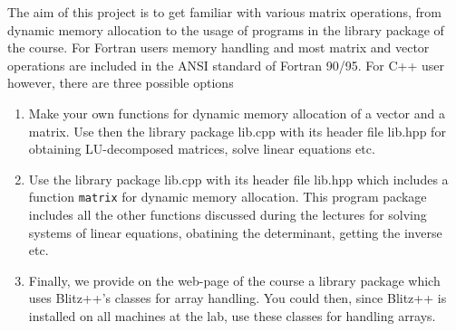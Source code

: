 The aim of this project is to get familiar with various matrix operations,
from dynamic memory allocation to the usage of programs in the library
package of the course. 
For Fortran users memory handling and most matrix and vector operations
are included in the ANSI standard of Fortran 90/95. For C++ user however,
there are three possible options
\begin{enumerate}
\item Make your own functions for dynamic memory allocation of a 
vector and a matrix. Use then the 
library package lib.cpp with its header file 
lib.hpp for obtaining LU-decomposed matrices, solve linear equations
etc.
\item Use the library package lib.cpp with its header file 
lib.hpp which includes a function \verb?matrix? for dynamic memory
allocation. This program package includes all the other functions
discussed during the lectures for solving systems of linear equations,
obatining the determinant, getting the inverse etc.
\item Finally, we provide on the web-page of the course a library package
which uses Blitz++'s classes for array handling. You could then, since
Blitz++ is installed on all machines at the lab, use these classes for handling
arrays.
\end{enumerate}

